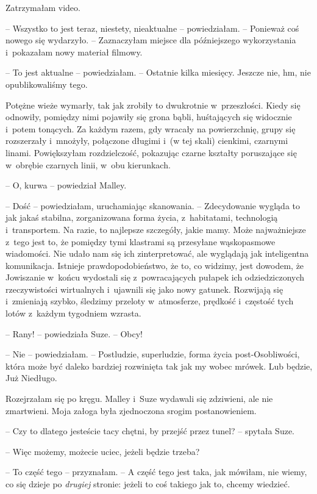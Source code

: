 \documentclass[oneside,polish,11pt,sfheadings]{mwbk}
\begin{document}
Zatrzymałam video. 

-- Wszystko to jest teraz, niestety, nieaktualne -- powiedziałam. -- Ponieważ coś nowego się wydarzyło. -- Zaznaczyłam miejsce
dla późniejszego wykorzystania i~pokazałam nowy materiał filmowy.

-- To jest aktualne -- powiedziałam. -- Ostatnie kilka miesięcy. Jeszcze
nie, hm, nie opublikowaliśmy tego.

Potężne wieże wymarły, tak jak zrobiły to dwukrotnie w~przeszłości.
Kiedy się odnowiły, pomiędzy nimi pojawiły się grona bąbli, huśtających
się widocznie i~potem tonących. Za każdym razem, gdy wracały na
powierzchnię, grupy się rozszerzały i~mnożyły, połączone długimi i~(w
tej skali) cienkimi, czarnymi linami. Powiększyłam rozdzielczość,
pokazując czarne kształty poruszające się w~obrębie czarnych linii, w~obu kierunkach.

-- O, kurwa -- powiedział Malley.

-- Dość -- powiedziałam, uruchamiając skanowania. -- Zdecydowanie wygląda
to jak jakaś stabilna, zorganizowana forma życia, z~habitatami,
technologią i~transportem. Na razie, to najlepsze szczegóły, jakie mamy.
Może najważniejsze z~tego jest to, że pomiędzy tymi klastrami są
przesyłane wąskopasmowe wiadomości. Nie udało nam się ich
zinterpretować, ale wyglądają jak inteligentna komunikacja. Istnieje
prawdopodobieństwo, że to, co widzimy, jest dowodem, że Jowiszanie w~końcu wydostali się z~powracających pułapek ich odziedziczonych
rzeczywistości wirtualnych i~ujawnili się jako nowy gatunek. Rozwijają
się i~zmieniają szybko, śledzimy przeloty w~atmosferze, prędkość i~częstość tych lotów z~każdym tygodniem wzrasta.

-- Rany! -- powiedziała Suze. -- Obcy!

-- Nie -- powiedziałam. -- Postludzie, superludzie, forma życia
post-Osobliwości, która może być daleko bardziej rozwinięta tak jak my
wobec mrówek. Lub będzie, Już Niedługo.

Rozejrzałam się po kręgu. Malley i~Suze wydawali się zdziwieni, ale nie
zmartwieni. Moja załoga była zjednoczona srogim postanowieniem.

-- Czy to dlatego jesteście tacy chętni, by przejść przez tunel? -- spytała Suze.

-- Więc możemy, możecie uciec, jeżeli będzie trzeba?

-- To część tego -- przyznałam. -- A część tego jest taka, jak mówiłam, nie
wiemy, co się dzieje po \textit{drugiej} stronie: jeżeli to coś takiego
jak to, chcemy wiedzieć.
\end{document}
